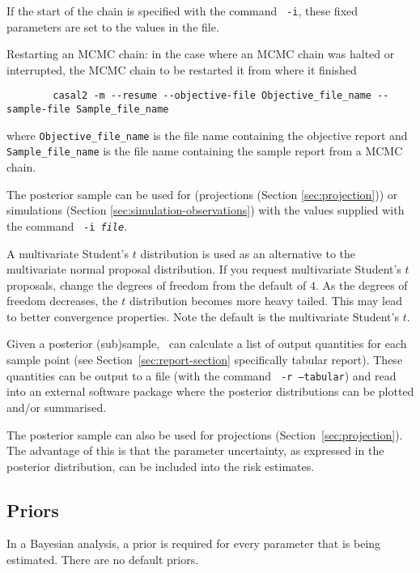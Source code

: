 If  the start of the chain is specified with the command \texttt{\cname\ -i}, these fixed parameters are set to the values in the file.

Restarting an MCMC chain: in the case where an MCMC chain was halted or interrupted, the MCMC chain to be restarted it from where it finished

{\small{\begin{verbatim}
		casal2 -m --resume --objective-file Objective_file_name --sample-file Sample_file_name
		\end{verbatim}}}
	
where \texttt{Objective\_file\_name} is the file name containing the objective report and \texttt{Sample\_file\_name} is the file name containing the sample report from a MCMC chain.

The posterior sample can be used for (projections (Section \ref{sec:projection})) or simulations (Section \ref{sec:simulation-observations}) with the values supplied with the command \texttt{\cname\ -i \emph{file}}.

A multivariate Student's $t$ distribution is used as an alternative to the multivariate normal proposal distribution. If you request multivariate Student's $t$ proposals, change the degrees of freedom from the default of 4. As the degrees of freedom decreases, the $t$ distribution becomes more heavy tailed. This may lead to better convergence properties. Note the default is the multivariate Student's $t$.

Given a posterior (sub)sample, \CNAME\ can calculate a list of output quantities for each sample point (see Section~\ref{sec:report-section} specifically tabular report). These quantities can be output to a file (with the command \texttt{\cname\ -r --tabular}) and read into an external software package where the posterior distributions can be plotted and/or summarised.

The posterior sample can also be used for projections (Section~\ref{sec:projection}). The advantage of this is that the parameter uncertainty, as expressed in the posterior distribution, can be included into the risk estimates.

\subsection{Priors\label{sec:priors}}

In a Bayesian analysis, a prior is required for every parameter that is being estimated. There are no default priors.

